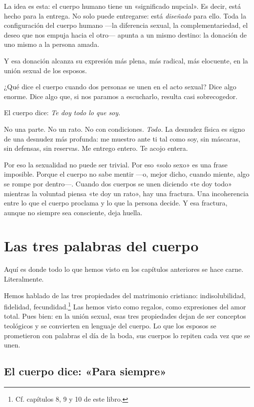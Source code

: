 La idea es esta: el cuerpo humano tiene un «significado nupcial». Es decir, está hecho para la entrega. No solo puede entregarse: está \emph{diseñado} para ello. Toda la configuración del cuerpo humano ---la diferencia sexual, la complementariedad, el deseo que nos empuja hacia el otro--- apunta a un mismo destino: la donación de uno mismo a la persona amada.

Y esa donación alcanza su expresión más plena, más radical, más elocuente, en la unión sexual de los esposos.

¿Qué dice el cuerpo cuando dos personas se unen en el acto sexual? Dice algo enorme. Dice algo que, si nos paramos a escucharlo, resulta casi sobrecogedor.

El cuerpo dice: \emph{Te doy todo lo que soy.}

No una parte. No un rato. No con condiciones. \emph{Todo.} La desnudez física es signo de una desnudez más profunda: me muestro ante ti tal como soy, sin máscaras, sin defensas, sin reservas. Me entrego entero. Te acojo entera.

Por eso la sexualidad no puede ser trivial. Por eso «solo sexo» es una frase imposible. Porque el cuerpo no sabe mentir ---o, mejor dicho, cuando miente, algo se rompe por dentro---. Cuando dos cuerpos se unen diciendo «te doy todo» mientras la voluntad piensa «te doy un rato», hay una fractura. Una incoherencia entre lo que el cuerpo proclama y lo que la persona decide. Y esa fractura, aunque no siempre sea consciente, deja huella.

\section{Las tres palabras del cuerpo}

Aquí es donde todo lo que hemos visto en los capítulos anteriores se hace carne. Literalmente.

Hemos hablado de las tres propiedades del matrimonio cristiano: indisolubilidad, fidelidad, fecundidad.\footnote{Cf. capítulos 8, 9 y 10 de este libro.} Las hemos visto como regalos, como expresiones del amor total. Pues bien: en la unión sexual, esas tres propiedades dejan de ser conceptos teológicos y se convierten en lenguaje del cuerpo. Lo que los esposos se prometieron con palabras el día de la boda, sus cuerpos lo repiten cada vez que se unen.

\subsection*{El cuerpo dice: «Para siempre»}

